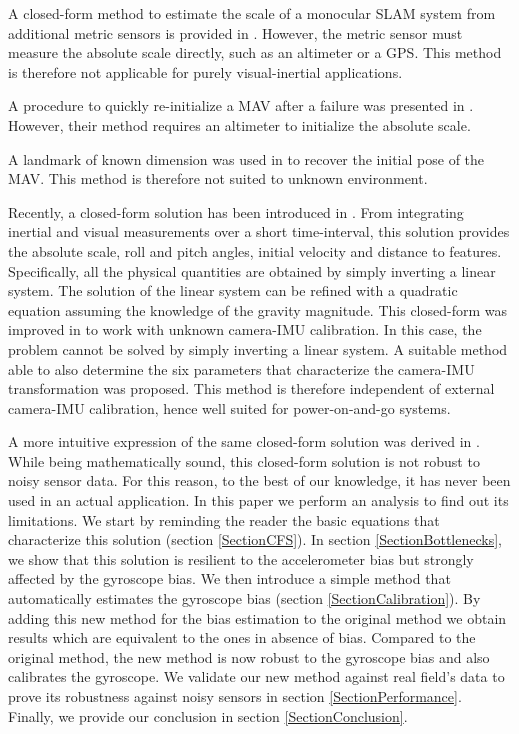 \documentclass[letterpaper, 10 pt, conference]{ieeeconf}  %
\begin{document}
A closed-form method to estimate the scale of a monocular SLAM system from additional
metric sensors is provided in \cite{Engel2014}.
However, the metric sensor must measure the absolute scale directly, such as an altimeter or a GPS.
This method is therefore not applicable for purely visual-inertial applications.

A procedure to quickly re-initialize a MAV after a failure was presented in \cite{Faessler2015}.
However, their method requires an altimeter to initialize the absolute scale.

A landmark of known dimension was used in \cite{Gemeiner2007} to recover the initial pose of the MAV.
This method is therefore not suited to unknown environment.

Recently, a closed-form solution has been introduced in \cite{Martinelli2012}.
From integrating inertial and visual measurements over a short time-interval, this solution provides the absolute scale, roll and pitch angles, initial velocity and distance to features.
Specifically, all the physical quantities are obtained by simply inverting a linear system.
The solution of the linear system can be refined with a quadratic equation assuming the knowledge of the gravity magnitude.
This closed-form was improved in \cite{Li2013} to work with unknown camera-IMU calibration.
In this case, the problem cannot be solved by simply inverting a linear system. A suitable method able to also determine the six parameters that characterize the camera-IMU transformation was proposed.
This method is therefore independent of external camera-IMU calibration, hence well suited for power-on-and-go systems.

A more intuitive expression of the same closed-form solution was derived in \cite{Martinelli2014}.
While being mathematically sound, this closed-form solution is not robust to noisy sensor data.
For this reason, to the best of our knowledge, it has never been used in an actual application.
In this paper we perform an analysis to find out its limitations. We start by reminding the reader the basic equations that characterize this solution (section \ref{SectionCFS}).
In section \ref{SectionBottlenecks}, we show that this solution is resilient to the accelerometer bias but strongly affected by the gyroscope bias.
We then introduce a simple method that automatically estimates the gyroscope bias (section \ref{SectionCalibration}).
By adding this new method for the bias estimation to the original method we obtain results which are equivalent to the ones in absence of bias.
Compared to the original method, the new method is now robust to the gyroscope bias and also calibrates the gyroscope.
We validate our new method against real field's data to prove its robustness against noisy sensors
in section \ref{SectionPerformance}. Finally, we provide our conclusion in section \ref{SectionConclusion}.
\end{document}
